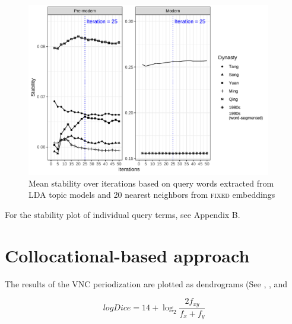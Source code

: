 \begin{figure}[H]
  \centering
  \includegraphics[width=0.95\textwidth,keepaspectratio]{figures_new/bootstrap_for_stability/stability.pdf}
  \caption{Mean stability over iterations based on query words extracted from LDA topic models and 20 nearest neighbors from \textsc{fixed} embeddings}
\end{figure}

For the stability plot of individual query terms, see Appendix B.

\section{Collocational-based approach}
The results of the VNC periodization are plotted as dendrograms (See , , and %

\begin{equation}
  logDice = 14 + \log_{2}{\frac{2f_{xy}}{f_x + f_y}}
\end{equation}

\parencite{rychly2008lexicographer}

